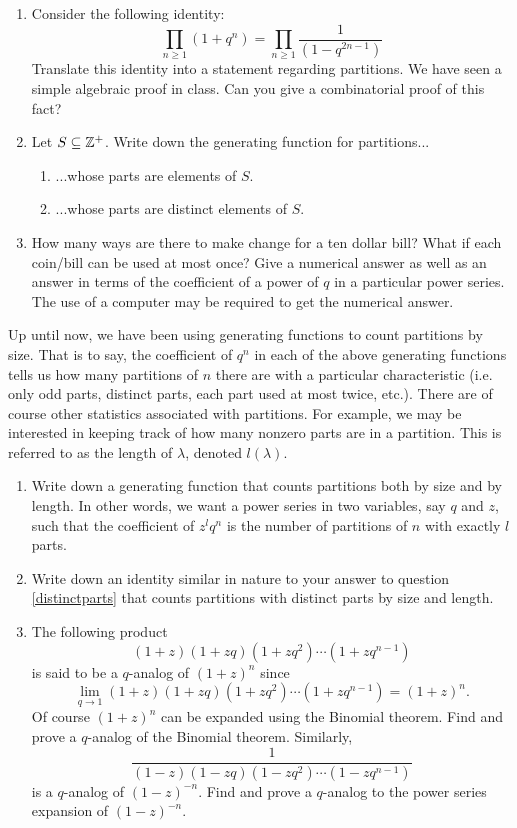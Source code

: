 \documentclass[10pt]{article}
\newcounter{lastexercise}
\newenvironment{exercises}
  {\begin{enumerate}
    \setcounter{enumi}\thelastexercise}
{\setcounter{lastexercise}\theenumi\end{enumerate}}
\begin{document}
\begin{exercises}
\item Consider the following identity:
$$\prod_{n\geq 1}(1+q^n) = \prod_{n\geq 1}\frac{1}{(1-q^{2n-1})}$$
Translate this identity into a statement regarding partitions.  We have seen a simple algebraic proof in class.  Can you give a combinatorial proof of this fact?


\item Let $S \subseteq \Bbb{Z}^{+}$.  Write down the generating function for partitions...
\begin{enumerate}
\item ...whose parts are elements of $S$.
\item ...whose parts are distinct elements of $S$.
\end{enumerate}

\item How many ways are there to make change for a ten dollar bill?  What if each coin/bill can be used at most once?  Give a numerical answer as well as an answer in terms of the coefficient of a power of $q$ in a particular power series.  The use of a computer may be required to get the numerical answer.

\end{exercises}

Up until now, we have been using generating functions to count partitions by size.  That is to say, the coefficient of $q^{n}$ in each of the above generating functions tells us how many partitions of $n$ there are with a particular characteristic (i.e. only odd parts, distinct parts, each part used at most twice, etc.).  There are of course other statistics associated with partitions.  For example, we may be interested in keeping track of how many nonzero parts are in a partition.  This is referred to as the length of $\lambda$, denoted $l(\lambda)$.

\begin{exercises}
\item Write down a generating function that counts partitions both by size and by length.  In other words, we want a power series in two variables, say $q$ and $z$, such that the coefficient of $z^{l}q^{n}$ is the number of partitions of $n$ with exactly $l$ parts.

\item Write down an identity similar in nature to your answer to question \ref{distinctparts} that counts partitions with distinct parts by size and length.

\item The following product
$$(1+z)(1+zq)(1+zq^2)\cdots (1+zq^{n-1})$$
is said to be a $q$-analog of $(1+z)^{n}$ since 
$$\lim_{q\rightarrow 1}(1+z)(1+zq)(1+zq^2)\cdots (1+zq^{n-1}) = (1+z)^{n}.$$
Of course $(1+z)^{n}$ can be expanded using the Binomial theorem.  Find and prove a $q$-analog of the Binomial theorem.  Similarly,
$$\frac{1}{(1-z)(1-zq)(1-zq^2)\cdots (1-zq^{n-1})}$$
is a $q$-analog of $(1-z)^{-n}$.  Find and prove a $q$-analog to the power series expansion of $(1-z)^{-n}$. 

\end{exercises}
\end{document}

